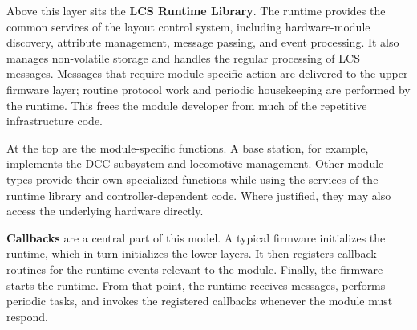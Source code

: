 Above this layer sits the \textbf{LCS Runtime Library}. The runtime provides the common services of the layout control system, including hardware-module discovery, attribute management, message passing, and event processing. It also manages non-volatile storage and handles the regular processing of LCS messages. Messages that require module-specific action are delivered to the upper firmware layer; routine protocol work and periodic housekeeping are performed by the runtime. This frees the module developer from much of the repetitive infrastructure code.

At the top are the module-specific functions. A base station, for example, implements the DCC subsystem and locomotive management. Other module types provide their own specialized functions while using the services of the runtime library and controller-dependent code. Where justified, they may also access the underlying hardware directly.

\textbf{Callbacks} are a central part of this model. A typical firmware initializes the runtime, which in turn initializes the lower layers. It then registers callback routines for the runtime events relevant to the module. Finally, the firmware starts the runtime. From that point, the runtime receives messages, performs periodic tasks, and invokes the registered callbacks whenever the module must respond.
